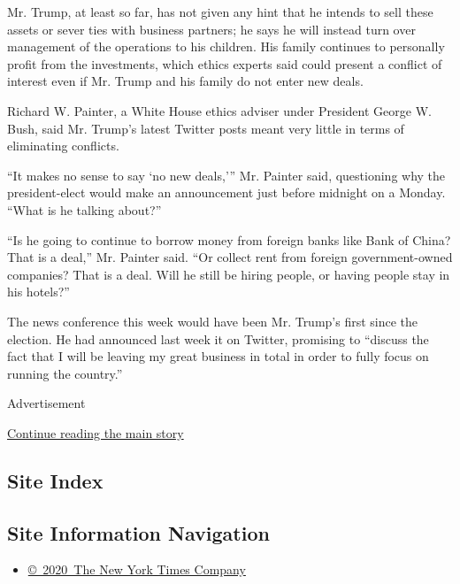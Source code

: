 Mr. Trump, at least so far, has not given any hint that he intends to
sell these assets or sever ties with business partners; he says he will
instead turn over management of the operations to his children. His
family continues to personally profit from the investments, which ethics
experts said could present a conflict of interest even if Mr. Trump and
his family do not enter new deals.

Richard W. Painter, a White House ethics adviser under President George
W. Bush, said Mr. Trump's latest Twitter posts meant very little in
terms of eliminating conflicts.

``It makes no sense to say `no new deals,''' Mr. Painter said,
questioning why the president-elect would make an announcement just
before midnight on a Monday. ``What is he talking about?''

``Is he going to continue to borrow money from foreign banks like Bank
of China? That is a deal,'' Mr. Painter said. ``Or collect rent from
foreign government-owned companies? That is a deal. Will he still be
hiring people, or having people stay in his hotels?''

The news conference this week would have been Mr. Trump's first since
the election. He had announced last week it on Twitter, promising to
``discuss the fact that I will be leaving my great business in total in
order to fully focus on running the country.''

Advertisement

\protect\hyperlink{after-bottom}{Continue reading the main story}

\hypertarget{site-index}{%
\subsection{Site Index}\label{site-index}}

\hypertarget{site-information-navigation}{%
\subsection{Site Information
Navigation}\label{site-information-navigation}}

\begin{itemize}
\tightlist
\item
  \href{https://help.nytimes.com/hc/en-us/articles/115014792127-Copyright-notice}{©~2020~The
  New York Times Company}
\end{itemize}

